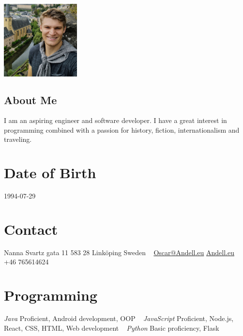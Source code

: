 \documentclass[]{k-cv} %
\begin{document}


\begin{aside} %
\includegraphics[width=4cm, height=4cm]{oscar2.jpg}
\begin{flushleft}
\section{About Me}
\color{gray}I am an aspiring engineer and software developer. I have a great interest in programming combined with a passion for history, fiction, internationalism and traveling. 
\end{flushleft}
\section{Date of Birth}
\color{gray}1994-07-29
\section{Contact}
Nanna Svartz gata 11
583 28 Linköping
Sweden
~
\href{mailto:john@smith.com}{Oscar@Andell.eu}
\href{http://Andell.eu/Oscar}{Andell.eu}
+46 765614624

\section{Programming}
\color{black}\textit{Java}
\color{gray}Proficient, Android development, OOP
~
\color{black}\textit{JavaScript}
\color{gray}Proficient, Node.js, React, CSS, HTML, Web development
~
\color{black}\textit{Python}
\color{gray}Basic proficiency, Flask
\end{aside}

\end{document}
